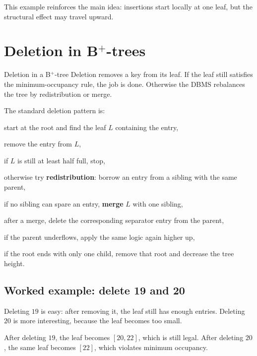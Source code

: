 \documentclass[../../dis.tex]{subfiles}
\begin{document}
This example reinforces the main idea: insertions start locally at one leaf, but the structural effect may travel upward.


\section{Deletion in B\texorpdfstring{$^+$}{+}-trees}
\begin{concept}{Deletion in a B\texorpdfstring{$^+$}{+}-tree}
Deletion removes a key from its leaf. If the leaf still satisfies the minimum-occupancy rule, the job is done. Otherwise the DBMS rebalances the tree by redistribution or merge.
\end{concept}

The standard deletion pattern is:
\begin{dashlist}
    \item start at the root and find the leaf \(L\) containing the entry,
    \item remove the entry from \(L\),
    \item if \(L\) is still at least half full, stop,
    \item otherwise try \textbf{redistribution}: borrow an entry from a sibling with the same parent,
    \item if no sibling can spare an entry, \textbf{merge} \(L\) with one sibling,
    \item after a merge, delete the corresponding separator entry from the parent,
    \item if the parent underflows, apply the same logic again higher up,
    \item if the root ends with only one child, remove that root and decrease the tree height.
\end{dashlist}

\subsection{Worked example: delete 19 and 20}
Deleting \(19\) is easy: after removing it, the leaf still has enough entries. Deleting \(20\) is more interesting, because the leaf becomes too small.

\begin{schema}
{\resizebox{0.98\textwidth}{!}{}}\par}
\end{schema}

After deleting \(19\), the leaf becomes \([20,22]\), which is still legal. After deleting \(20\), the same leaf becomes \([22]\), which violates minimum occupancy.
\end{document}
